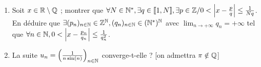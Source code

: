 
\begin{statementbox}
\begin{enumerate}[label=\alph*)]
  \item Soit $x \in \mathbb R \setminus \mathbb Q$ ; montrer que $\forall N \in \mathbb N^*, \exists q \in \llbracket 1, N \rrbracket, \exists p \in \mathbb Z / 0 < \left| x - \frac{p}{q} \right| \leq \frac{1}{N q}$.
  En déduire que $\exists (p_n)_{n \in \mathbb N} \in \mathbb Z^\mathbb N, (q_n)_{n \in \mathbb N} \in (\mathbb N^*)^\mathbb N$ avec $\lim_{n \to +\infty} q_n = +\infty$ tel que $\forall n \in \mathbb N, 0 < \left| x - \frac{p_n}{q_n} \right| \leq \frac{1}{q_n^2}$.
  \item La suite $u_n = \left( \frac{1}{n \sin(n)} \right)_{n \in \mathbb N}$ converge-t-elle ? [on admettra $\pi \notin \mathbb Q$]
\end{enumerate}
\end{statementbox}

